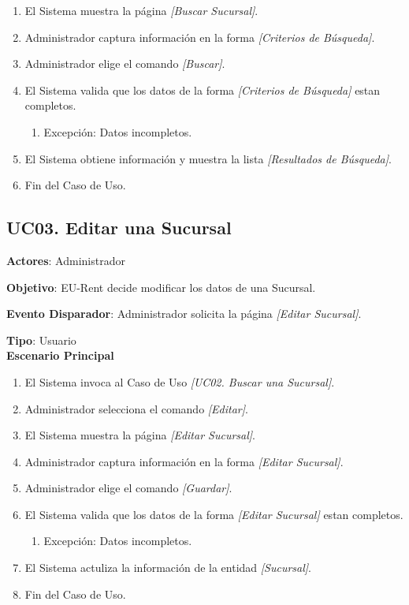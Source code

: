 \documentclass[10pt, letterpaper]{report}
\begin{document}
\begin{enumerate}
\item El Sistema muestra la página \textit{[Buscar Sucursal]}.
\item Administrador captura información en la forma \textit{[Criterios de Búsqueda]}.
\item Administrador elige el comando \textit{[Buscar]}.
\item El Sistema valida que los datos de la forma \textit{[Criterios de Búsqueda]} estan completos.
	\begin{enumerate}
		\item Excepción: Datos incompletos.
	\end{enumerate}
\item El Sistema obtiene información y muestra la lista \textit{[Resultados de Búsqueda]}.
\item Fin del Caso de Uso.
\end{enumerate}
\subsection{UC03. Editar una Sucursal} \label{EditarSucursal}
\textbf{Actores}: Administrador

\textbf{Objetivo}: EU-Rent decide modificar los datos de una Sucursal.

\textbf{Evento Disparador}: Administrador solicita la página \textit{[Editar Sucursal]}.

\textbf{Tipo}: Usuario\\

\textbf{Escenario Principal}

\begin{enumerate}
\item El Sistema invoca al Caso de Uso \textit{[UC02. Buscar una Sucursal]}.
\item Administrador selecciona el comando \textit{[Editar]}.
\item El Sistema muestra la página \textit{[Editar Sucursal]}.
\item Administrador captura información en la forma \textit{[Editar Sucursal]}.
\item Administrador elige el comando \textit{[Guardar]}.
\item El Sistema valida que los datos de la forma \textit{[Editar Sucursal]} estan completos.
	\begin{enumerate}
		\item Excepción: Datos incompletos.
	\end{enumerate}
\item El Sistema actuliza la información de la entidad \textit{[Sucursal]}.
\item Fin del Caso de Uso.
\end{enumerate}
\end{document}
